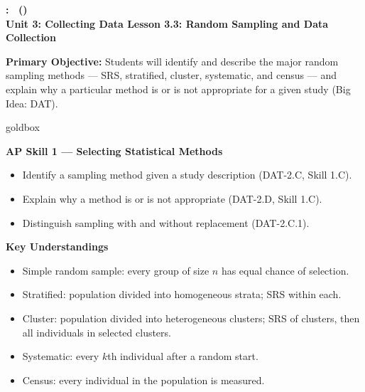 \documentclass[10pt]{article}
\newcommand{\UnitNumberName}{Unit 3: Collecting Data \quad}
\newcommand{\LessonNumberName}{Lesson 3.3: Random Sampling and Data Collection}
\begin{document}
\begin{center}
    {\Large\bfseries \CourseName: \SchoolYear\ (\MeetingLength) \\
    {\small\bfseries \UnitNumberName \LessonNumberName}}
\end{center}

\begin{tcolorbox}[colback=sky, colframe=navy, boxrule=0.9pt, arc=2mm,
    left=2mm, right=2mm, top=1.5mm, bottom=1.5mm]
    \textbf{Primary Objective:} Students will identify and describe the major random
    sampling methods --- SRS, stratified, cluster, systematic, and census --- and
    explain why a particular method is or is not appropriate for a given study
    (Big Idea: DAT).
\end{tcolorbox}

\renewcommand{\arraystretch}{1.6}
\begin{skillbox}{goldbox}
\begin{minipage}[t]{0.48\linewidth}
    \textbf{AP Skill 1 --- Selecting Statistical Methods}
    \begin{itemize}
        \item Identify a sampling method given a study description (DAT-2.C, Skill 1.C).
        \item Explain why a method is or is not appropriate (DAT-2.D, Skill 1.C).
        \item Distinguish sampling with and without replacement (DAT-2.C.1).
    \end{itemize}
\end{minipage}
\hfill
\begin{minipage}[t]{0.48\linewidth}
    \textbf{Key Understandings}
    \begin{itemize}
        \item Simple random sample: every group of size $n$ has equal chance of selection.
        \item Stratified: population divided into homogeneous strata; SRS within each.
        \item Cluster: population divided into heterogeneous clusters; SRS of clusters,
              then all individuals in selected clusters.
        \item Systematic: every $k$th individual after a random start.
        \item Census: every individual in the population is measured.
    \end{itemize}
\end{minipage}
\end{skillbox}
\end{document}
